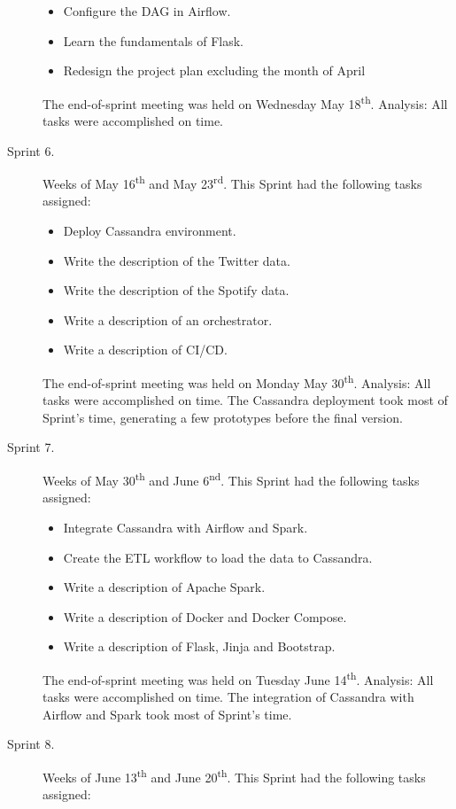 \begin{description}
	\begin{itemize}
		\item Configure the DAG in Airflow.
		\item Learn the fundamentals of Flask.
		\item Redesign the project plan excluding the month of April
	\end{itemize}
	The end-of-sprint meeting was held on Wednesday May 18\textsuperscript{th}. Analysis: All tasks were accomplished on time.
	\item[Sprint 6.] Weeks of May 16\textsuperscript{th} and May 23\textsuperscript{rd}. This Sprint had the following tasks assigned:
	\begin{itemize}
		\item Deploy Cassandra environment.
		\item Write the description of the Twitter data.
		\item Write the description of the Spotify data.
		\item Write a description of an orchestrator.
		\item Write a description of CI/CD.
	\end{itemize}
	The end-of-sprint meeting was held on Monday May 30\textsuperscript{th}. Analysis: All tasks were accomplished on time. The Cassandra deployment took most of Sprint's time, generating a few prototypes before the final version.
	\item[Sprint 7.] Weeks of May 30\textsuperscript{th} and June 6\textsuperscript{nd}. This Sprint had the following tasks assigned:
	\begin{itemize}
		\item Integrate Cassandra with Airflow and Spark.
		\item Create the ETL workflow to load the data to Cassandra.
		\item Write a description of Apache Spark.
		\item Write a description of Docker and Docker Compose.
		\item Write a description of Flask, Jinja and Bootstrap.
	\end{itemize}
	The end-of-sprint meeting was held on Tuesday June 14\textsuperscript{th}. Analysis: All tasks were accomplished on time. The integration of Cassandra with Airflow and Spark took most of Sprint's time.
	\item[Sprint 8.] Weeks of June 13\textsuperscript{th} and June 20\textsuperscript{th}. This Sprint had the following tasks assigned:
	\begin{itemize}

\end{itemize}
\end{description}
